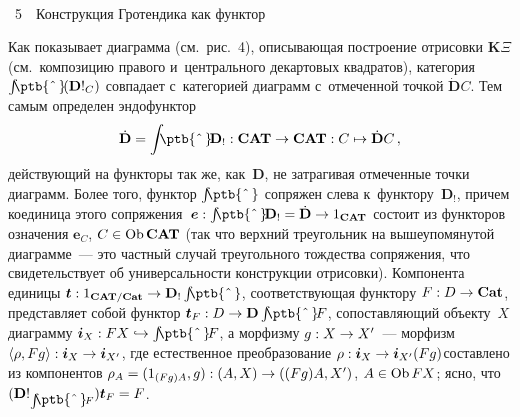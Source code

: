 \begin{multicols}{2}
   { \begin{center}  %
 \vspace*{-1pt}
     \mbox{%
\epsfxsize=49.793mm 
}

\vspace*{6pt}



\noindent
{{\figurename~5}\ \ \small{Конструкция Гротендика как функтор
}}
\end{center}
}

\vspace*{6pt}

\addtocounter{figure}{1}
  
     
     Как показывает диаграмма (см.\ рис.~4), описывающая 
построение отрисовки $\mathbf{K}\Xi$ (см.\ композицию правого 
и~центрального декартовых квадратов), категория $\int 
{\mbox{\!\!\!\ptb{\^{\,}}}}\! (\mathbf{D}!_C)$ совпадает с~категорией диаграмм с~отмеченной точкой $\dot{\mathbf{D}}C$. Тем самым определен эндофунктор
     $$
     \dot{\mathbf{D}} = \int 
{\mbox{\!\!\!\ptb{\^{\,}}}}\!\mathbf{D}_! : \mathbf{CAT}\to 
\mathbf{CAT} : C \mapsto \dot{\mathbf{D}}C\,,
     $$
действующий на функторы так же, как~$\mathbf{D}$, не затрагивая 
отмеченные точки диаграмм. Более того, функтор $\int 
{\mbox{\!\!\!\ptb{\^{\,}}}}$ сопряжен слева к~функтору~$\mathbf{D}_!$, 
причем коединица этого сопряжения~$\bm{e} : \int 
{\mbox{\!\!\!\ptb{\^{\,}}}} \!\mathbf{D}_! \hm= \dot{\mathbf{D}}\hm\to 
1_{\mathbf{CAT}}$ состоит из функторов означения $\bm{e}_C$, $C \hm\in 
\mathrm{Ob}\,\mathbf{CAT}$ (так что верхний треугольник на 
вышеупомянутой диаграмме~--- это частный случай треугольного тож\-дест\-ва 
сопряжения, что свидетельствует об универсальности конструкции отрисовки). 
Компонента единицы $\bm{t}: 1_{\mathbf{CAT}/\mathbf{Cat}} \hm\to  \mathbf{D}_! \int{\mbox{\!\!\!\ptb{\^{\,}}}}$, 
со\-от\-вет\-ст\-ву\-ющая функтору $F : D \hm\to \mathbf{Cat}$, 
представляет собой функтор $\bm{t}_F : D \hm\to \mathbf{D}\int 
{\mbox{\!\!\!\ptb{\^{\,}}}} \!F$, сопоставляющий объекту~$X$\linebreak диаграмму  
$\bm{i}_X : FX \hookrightarrow \int {\mbox{\!\!\!\ptb{\^{\,}}}}\! F$, а морфизму 
$g : X \hm\to  X^\prime$~--- морфизм $\langle\rho, Fg\rangle : \bm{i}_X \hm\to  
\bm{i}_{X^\prime}$, где естественное преобразование $\rho : \bm{i}_X \hm\to 
\bm{i}_{X^\prime}(Fg)$\linebreak со\-став\-ле\-но из компонентов $\rho_A\hm = (1_{(Fg)A}, g) : (A, 
X) \hm\to  ((Fg)A, X^\prime)$, $A \hm\in \mathrm{Ob}\,FX$; ясно, что 
$(\mathbf{D}!_{\int {\mbox{\!\!\!\ptb{\^{\,}}}} \!F})\bm{t}_F \hm= F$.


\end{multicols}
